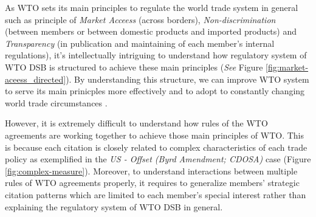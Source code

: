 As WTO sets its main principles to regulate the world trade system in general
such as principle of \textit{Market Acceess} (across borders), 
\textit{Non-discrimination} (between members 
or between domestic products and imported products) 
and \textit{Transparency} (in publication and maintaining 
of each member's internal regulations), 
it's intellectually intriguing 
to understand how regulatory system of WTO DSB
is structured to achieve these main principles (\textit{See} Figure \ref{fig:market-aceess_directed}).
By understanding this structure, 
we can improve WTO system to serve its main prinicples more effectively 
and to adopt to constantly
changing world trade circumstances
\citep{FREDEBEULKREIN1999625, shaffer_2004, 10.1093/jiel/jgm028}.

However, it is extremely difficult to 
understand how rules of the WTO agreements are
working together to achieve those main principles of WTO. 
This is because each citation is closely related 
to complex characteristics 
of each trade policy as exemplified in 
the \textit{US - Offset (Byrd Amendment; CDOSA)} case (Figure \ref{fig:complex-measure}). 
Moreover, to understand interactions between multiple rules of WTO agreements properly, 
it requires to generalize members' strategic 
citation patterns which are limited 
to each member's special interest 
rather than explaining the 
regulatory system of WTO DSB in general.


